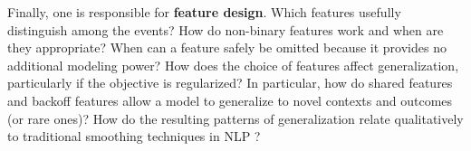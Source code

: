 \documentclass[11pt,letterpaper]{article}
\begin{document}
Finally, one is responsible for \textbf{feature design}.  Which
features usefully distinguish among the events?  How do non-binary
features work and when are they appropriate?  When can a feature
safely be omitted because it provides no additional modeling power?
How does the choice of features affect generalization, particularly if
the objective is regularized?
%
% 
In particular, how do shared features and backoff features allow a model to
generalize to novel contexts and outcomes (or rare ones)?  How do the
resulting patterns of generalization relate qualitatively to
traditional smoothing techniques in NLP \cite{chen-goodman-1996}?

\end{document}

